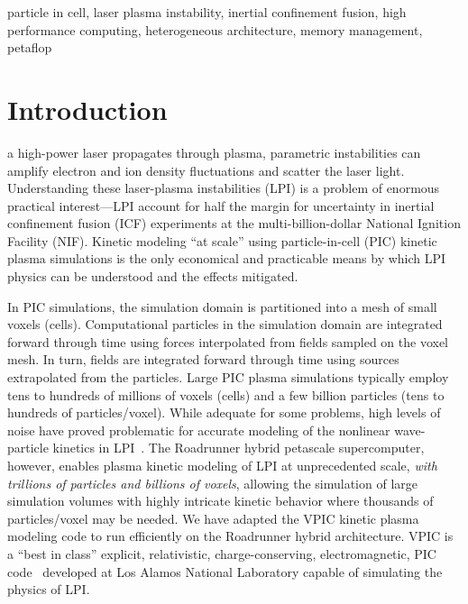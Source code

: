 \documentclass[journal,twoside]{IEEEtran}
\begin{document}
\begin{IEEEkeywords}
particle in cell,
laser plasma instability,
inertial confinement fusion,
high performance computing,
heterogeneous architecture,
memory management,
petaflop
\end{IEEEkeywords}

\section{Introduction}

 a high-power laser propagates through plasma,
parametric instabilities can amplify electron and ion density
fluctuations and scatter the laser light.  Understanding these
laser-plasma instabilities (LPI) is a problem of enormous practical
interest---LPI account for half the margin for uncertainty in inertial
confinement fusion (ICF) experiments at the multi-billion-dollar
National Ignition Facility (NIF).  Kinetic modeling ``at scale'' using
particle-in-cell (PIC) kinetic plasma simulations is the only
economical and practicable means by which LPI physics can be
understood and the effects mitigated.

In PIC simulations, the simulation domain is partitioned into a mesh
of small voxels (cells).  Computational particles in the simulation
domain are integrated forward through time using forces interpolated
from fields sampled on the voxel mesh.  In turn, fields are integrated
forward through time using sources extrapolated from the particles.
Large PIC plasma simulations typically employ tens to hundreds of
millions of voxels (cells) and a few billion particles (tens to
hundreds of particles/voxel).  While adequate for some problems, high
levels of noise have proved problematic for accurate modeling of the
nonlinear wave-particle kinetics in
LPI~\cite{Yin_et_al_Phys_Plasmas_2006}.  The Roadrunner hybrid
petascale supercomputer, however, enables plasma kinetic modeling of
LPI at unprecedented scale, \textit{with trillions of particles and
billions of voxels}, allowing the simulation of large simulation
volumes with highly intricate kinetic behavior where thousands of
particles/voxel may be needed.  We have adapted the VPIC kinetic
plasma modeling code to run efficiently on the Roadrunner hybrid
architecture.  VPIC is a ``best in class'' explicit, relativistic,
charge-conserving, electromagnetic, PIC
code~\cite{Bowers_et_al_Phys_Plasmas_2007} developed at Los Alamos
National Laboratory capable of simulating the physics of LPI.
\end{document}
